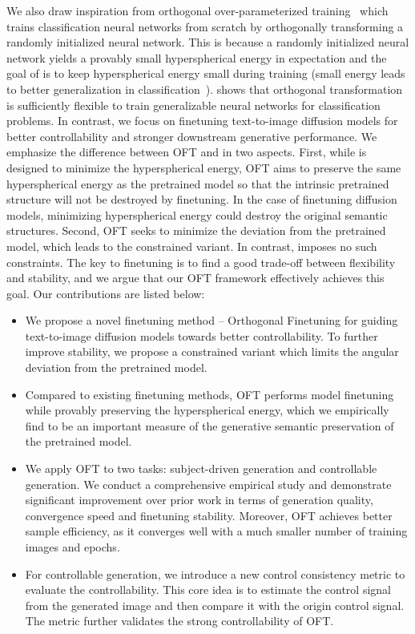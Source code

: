 We also draw inspiration from orthogonal over-parameterized training~\cite{liu2021orthogonal} which trains classification neural networks from scratch by orthogonally transforming a randomly initialized neural network. This is because a randomly initialized neural network yields a provably small hyperspherical energy in expectation and the goal of \cite{liu2021orthogonal} is to keep hyperspherical energy small during training (small energy leads to better generalization in classification~\cite{liu2018learning,lin2020regularizing}). \cite{liu2021orthogonal} shows that orthogonal transformation is sufficiently flexible to train generalizable neural networks for classification problems. In contrast, we focus on finetuning text-to-image diffusion models for better controllability and stronger downstream generative performance. We emphasize the difference between OFT and \cite{liu2021orthogonal} in two aspects. First, while \cite{liu2021orthogonal} is designed to minimize the hyperspherical energy, OFT aims to preserve the same hyperspherical energy as the pretrained model so that the intrinsic pretrained structure will not be destroyed by finetuning. In the case of finetuning diffusion models, minimizing hyperspherical energy could destroy the original semantic structures. Second, OFT seeks to minimize the deviation from the pretrained model, which leads to the constrained variant. In contrast, \cite{liu2021orthogonal} imposes no such constraints. The key to finetuning is to find a good trade-off between flexibility and stability, and we argue that our OFT framework effectively achieves this goal. Our contributions are listed below:

\begin{itemize}[leftmargin=*,nosep]

    \item We propose a novel finetuning method -- Orthogonal Finetuning for guiding text-to-image diffusion models towards better controllability. To further improve stability, we propose a constrained variant which limits the angular deviation from the pretrained model.
    \item Compared to existing finetuning methods, OFT performs model finetuning while provably preserving the hyperspherical energy, which we empirically find to be an important measure of the generative semantic preservation of the pretrained model.
    \item We apply OFT to two tasks: subject-driven generation and controllable generation. We conduct a comprehensive empirical study and demonstrate significant improvement over prior work in terms of generation quality, convergence speed and finetuning stability. Moreover, OFT achieves better sample efficiency, as it converges well with a much smaller number of training images and epochs.
    \item For controllable generation, we introduce a new control consistency metric to evaluate the controllability. This core idea is to estimate the control signal from the generated image and then compare it with the origin control signal. The metric further validates the strong controllability of OFT.
\end{itemize}

